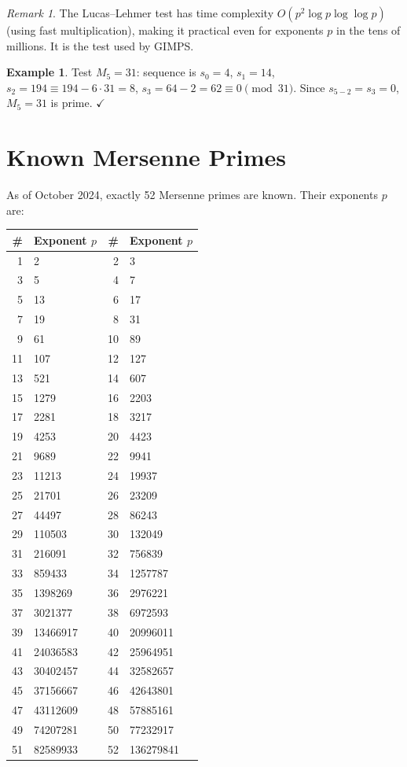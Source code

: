 \documentclass[12pt,a4paper]{amsart}
\theoremstyle{definition}
\newtheorem{example}[theorem]{Example}
\theoremstyle{remark}
\newtheorem{remark}[theorem]{Remark}
\begin{document}
\begin{remark}
The Lucas--Lehmer test has time complexity $O(p^2 \log p \log \log p)$
(using fast multiplication), making it practical even for exponents $p$
in the tens of millions.
It is the test used by GIMPS.
\end{remark}

\begin{example}
Test $M_5 = 31$: sequence is $s_0 = 4$, $s_1 = 14$, $s_2 = 194 \equiv 194 - 6\cdot31 = 8$,
$s_3 = 64 - 2 = 62 \equiv 0 \pmod{31}$. Since $s_{5-2} = s_3 = 0$, $M_5 = 31$ is prime. $\checkmark$
\end{example}

\section{Known Mersenne Primes}

As of October 2024, exactly 52 Mersenne primes are known.
Their exponents $p$ are:

\begin{center}
\begin{tabular}{rlrl}
\toprule
\# & Exponent $p$ & \# & Exponent $p$ \\
\midrule
1 & 2 & 2 & 3 \\
3 & 5 & 4 & 7 \\
5 & 13 & 6 & 17 \\
7 & 19 & 8 & 31 \\
9 & 61 & 10 & 89 \\
11 & 107 & 12 & 127 \\
13 & 521 & 14 & 607 \\
15 & 1279 & 16 & 2203 \\
17 & 2281 & 18 & 3217 \\
19 & 4253 & 20 & 4423 \\
21 & 9689 & 22 & 9941 \\
23 & 11213 & 24 & 19937 \\
25 & 21701 & 26 & 23209 \\
27 & 44497 & 28 & 86243 \\
29 & 110503 & 30 & 132049 \\
31 & 216091 & 32 & 756839 \\
33 & 859433 & 34 & 1257787 \\
35 & 1398269 & 36 & 2976221 \\
37 & 3021377 & 38 & 6972593 \\
39 & 13466917 & 40 & 20996011 \\
41 & 24036583 & 42 & 25964951 \\
43 & 30402457 & 44 & 32582657 \\
45 & 37156667 & 46 & 42643801 \\
47 & 43112609 & 48 & 57885161 \\
49 & 74207281 & 50 & 77232917 \\
51 & 82589933 & 52 & 136279841 \\
\bottomrule
\end{tabular}
\end{center}
\end{document}
